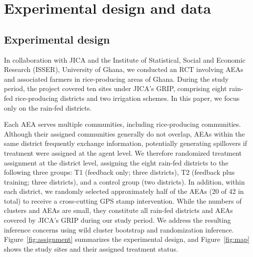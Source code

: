 \documentclass[11pt]{article}
\begin{document}
\section{Experimental design and data}\label{sec:design}

\subsection{Experimental design}

In collaboration with JICA and the Institute of Statistical, Social and Economic Research (ISSER), University of Ghana, we conducted an RCT involving AEAs and associated farmers in rice-producing areas of Ghana. During the study period, the project covered ten sites under JICA's GRIP, comprising eight rain-fed rice-producing districts and two irrigation schemes. In this paper, we focus only on the rain-fed districts.
 
Each AEA serves multiple communities, including rice-producing communities. Although their assigned communities generally do not overlap, AEAs within the same district frequently exchange information, potentially generating spillovers if treatment were assigned at the agent level. We therefore randomized treatment assignment at the district level, assigning the eight rain-fed districts to the following three groups: T1 (feedback only; three districts), T2 (feedback plus training; three districts), and a control group (two districts). In addition, within each district, we randomly selected approximately half of the AEAs (20 of 42 in total) to receive a cross-cutting GPS stamp intervention. While the numbers of clusters and AEAs are small, they constitute all rain-fed districts and AEAs covered by JICA’s GRIP during our study period. We address the resulting inference concerns using wild cluster bootstrap and randomization inference. Figure~\ref{fig:assignment} summarizes the experimental design, and Figure~\ref{fig:map} shows the study sites and their assigned treatment status.
\end{document}
